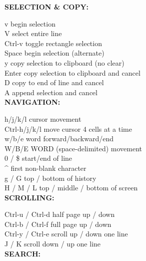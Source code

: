 \documentclass[11pt,a4paper,twoside]{book}
\begin{document}
\vspace{12pt}
{\bfseries\color{neonyellow} SELECTION \& COPY:}\vspace{4pt}

v                     begin selection\\
V                     select entire line\\
Ctrl-v               toggle rectangle selection\\
Space                 begin selection (alternate)\\
y                     copy selection to clipboard (no clear)\\
Enter                 copy selection to clipboard and cancel\\
D                     copy to end of line and cancel\\
A                     append selection and cancel\\


\vspace{12pt}
{\bfseries\color{neonyellow} NAVIGATION:}\vspace{4pt}

h/j/k/l              cursor movement\\
Ctrl-h/j/k/l         move cursor 4 cells at a time\\
w/b/e                word forward/backward/end\\
W/B/E                WORD (space-delimited) movement\\
0 / \$                start/end of line\\
\textasciicircum{}                     first non-blank character\\
g / G                top / bottom of history\\
H / M / L            top / middle / bottom of screen\\


\vspace{12pt}
{\bfseries\color{neonyellow} SCROLLING:}\vspace{4pt}

Ctrl-u / Ctrl-d      half page up / down\\
Ctrl-b / Ctrl-f      full page up / down\\
Ctrl-y / Ctrl-e      scroll up / down one line\\
J / K                scroll down / up one line\\


\vspace{12pt}
{\bfseries\color{neonyellow} SEARCH:}\vspace{4pt}
\end{document}

